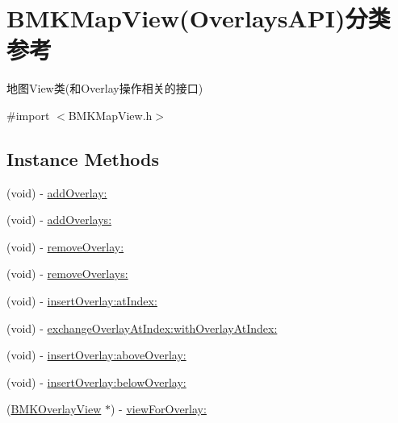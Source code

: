 \hypertarget{category_b_m_k_map_view_07_overlays_a_p_i_08}{\section{B\+M\+K\+Map\+View(Overlays\+A\+P\+I)分类 参考}
\label{category_b_m_k_map_view_07_overlays_a_p_i_08}
}


地图\+View类(和\+Overlay操作相关的接口)  




{\ttfamily \#import $<$B\+M\+K\+Map\+View.\+h$>$}

\subsection*{Instance Methods}
\begin{DoxyCompactItemize}
\item 
(void) -\/ \hyperlink{category_b_m_k_map_view_07_overlays_a_p_i_08_af85ad6091568df29d9e7c3dea82a1a2b}{add\+Overlay\+:}
\item 
(void) -\/ \hyperlink{category_b_m_k_map_view_07_overlays_a_p_i_08_ab7d29d948515cc6d947d6aa63f904168}{add\+Overlays\+:}
\item 
(void) -\/ \hyperlink{category_b_m_k_map_view_07_overlays_a_p_i_08_a3be1f2a019df3ff971f6a36f142e55be}{remove\+Overlay\+:}
\item 
(void) -\/ \hyperlink{category_b_m_k_map_view_07_overlays_a_p_i_08_a3eb7909fb1adce117c1de432fd5d816a}{remove\+Overlays\+:}
\item 
(void) -\/ \hyperlink{category_b_m_k_map_view_07_overlays_a_p_i_08_adc0775a2651c1e4099f93d9c1bbffe3d}{insert\+Overlay\+:at\+Index\+:}
\item 
(void) -\/ \hyperlink{category_b_m_k_map_view_07_overlays_a_p_i_08_a62c1c29b8e5b408ba0c40411a3c1f50f}{exchange\+Overlay\+At\+Index\+:with\+Overlay\+At\+Index\+:}
\item 
(void) -\/ \hyperlink{category_b_m_k_map_view_07_overlays_a_p_i_08_ad94b45c4df7978e3a6095918323496d3}{insert\+Overlay\+:above\+Overlay\+:}
\item 
(void) -\/ \hyperlink{category_b_m_k_map_view_07_overlays_a_p_i_08_a73dfe9f74d722b7b1fc477e791f34653}{insert\+Overlay\+:below\+Overlay\+:}
\item 
(\hyperlink{interface_b_m_k_overlay_view}{B\+M\+K\+Overlay\+View} $\ast$) -\/ \hyperlink{category_b_m_k_map_view_07_overlays_a_p_i_08_aa88093440ad22f7af9cf9a36051f662d}{view\+For\+Overlay\+:}
\end{DoxyCompactItemize}
